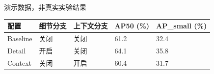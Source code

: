 \textcolor{GMOrange}{演示数据，非真实实验结果}\par\medskip
\begin{tabular}{lllll}
\toprule
配置 & 细节分支 & 上下文分支 & AP50 (\%) & AP\_small (\%) \\
\midrule
Baseline & 关闭 & 关闭 & 61.2 & 32.4 \\
Detail & 开启 & 关闭 & 64.1 & 35.8 \\
Context & 关闭 & 开启 & 60.4 & 31.7 \\
\bottomrule
\end{tabular}
